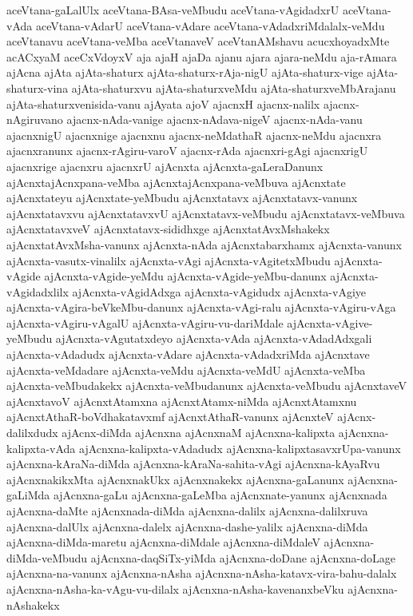 {aceVtana-gaLalUlx
aceVtana-BAsa-veMbudu
aceVtana-vAgidadxrU
aceVtana-vAda
aceVtana-vAdarU
aceVtana-vAdare
aceVtana-vAdadxriMdalalx-veMdu
aceVtanavu
aceVtana-veMba
aceVtanaveV
aceVtanAMshavu
acucxhoyadxMte
acACxyaM
aceCxVdoyxV
aja
ajaH
ajaDa
ajanu
ajara
ajara-neMdu
aja-rAmara
ajAcna
ajAta
ajAta-shaturx
ajAta-shaturx-rAja-nigU
ajAta-shaturx-vige
ajAta-shaturx-vina
ajAta-shaturxvu
ajAta-shaturxveMdu
ajAta-shaturxveMbArajanu
ajAta-shaturxvenisida-vanu
ajAyata
ajoV
ajacnxH
ajacnx-nalilx
ajacnx-nAgiruvano
ajacnx-nAda-vanige
ajacnx-nAdava-nigeV
ajacnx-nAda-vanu
ajacnxnigU
ajacnxnige
ajacnxnu
ajacnx-neMdathaR
ajacnx-neMdu
ajacnxra
ajacnxranunx
ajacnx-rAgiru-varoV
ajacnx-rAda
ajacnxri-gAgi
ajacnxrigU
ajacnxrige
ajacnxru
ajacnxrU
ajAcnxta
ajAcnxta-gaLeraDanunx
ajAcnxtajAcnxpana-veMba
ajAcnxtajAcnxpana-veMbuva
ajAcnxtate
ajAcnxtateyu
ajAcnxtate-yeMbudu
ajAcnxtatavx
ajAcnxtatavx-vanunx
ajAcnxtatavxvu
ajAcnxtatavxvU
ajAcnxtatavx-veMbudu
ajAcnxtatavx-veMbuva
ajAcnxtatavxveV
ajAcnxtatavx-sididhxge
ajAcnxtatAvxMshakekx
ajAcnxtatAvxMsha-vanunx
ajAcnxta-nAda
ajAcnxtabarxhamx
ajAcnxta-vanunx
ajAcnxta-vasutx-vinalilx
ajAcnxta-vAgi
ajAcnxta-vAgitetxMbudu
ajAcnxta-vAgide
ajAcnxta-vAgide-yeMdu
ajAcnxta-vAgide-yeMbu-danunx
ajAcnxta-vAgidadxlilx
ajAcnxta-vAgidAdxga
ajAcnxta-vAgidudx
ajAcnxta-vAgiye
ajAcnxta-vAgira-beVkeMbu-danunx
ajAcnxta-vAgi-ralu
ajAcnxta-vAgiru-vAga
ajAcnxta-vAgiru-vAgalU
ajAcnxta-vAgiru-vu-dariMdale
ajAcnxta-vAgive-yeMbudu
ajAcnxta-vAgutatxdeyo
ajAcnxta-vAda
ajAcnxta-vAdadAdxgali
ajAcnxta-vAdadudx
ajAcnxta-vAdare
ajAcnxta-vAdadxriMda
ajAcnxtave
ajAcnxta-veMdadare
ajAcnxta-veMdu
ajAcnxta-veMdU
ajAcnxta-veMba
ajAcnxta-veMbudakekx
ajAcnxta-veMbudanunx
ajAcnxta-veMbudu
ajAcnxtaveV
ajAcnxtavoV
ajAcnxtAtamxna
ajAcnxtAtamx-niMda
ajAcnxtAtamxnu
ajAcnxtAthaR-boVdhakatavxmf
ajAcnxtAthaR-vanunx
ajAcnxteV
ajAcnx-dalilxdudx
ajAcnx-diMda
ajAcnxna
ajAcnxnaM
ajAcnxna-kalipxta
ajAcnxna-kalipxta-vAda
ajAcnxna-kalipxta-vAdadudx
ajAcnxna-kalipxtasavxrUpa-vanunx
ajAcnxna-kAraNa-diMda
ajAcnxna-kAraNa-sahita-vAgi
ajAcnxna-kAyaRvu
ajAcnxnakikxMta
ajAcnxnakUkx
ajAcnxnakekx
ajAcnxna-gaLanunx
ajAcnxna-gaLiMda
ajAcnxna-gaLu
ajAcnxna-gaLeMba
ajAcnxnate-yanunx
ajAcnxnada
ajAcnxna-daMte
ajAcnxnada-diMda
ajAcnxna-dalilx
ajAcnxna-dalilxruva
ajAcnxna-dalUlx
ajAcnxna-dalelx
ajAcnxna-dashe-yalilx
ajAcnxna-diMda
ajAcnxna-diMda-maretu
ajAcnxna-diMdale
ajAcnxna-diMdaleV
ajAcnxna-diMda-veMbudu
ajAcnxna-daqSiTx-yiMda
ajAcnxna-doDane
ajAcnxna-doLage
ajAcnxna-na-vanunx
ajAcnxna-nAsha
ajAcnxna-nAsha-katavx-vira-bahu-dalalx
ajAcnxna-nAsha-ka-vAgu-vu-dilalx
ajAcnxna-nAsha-kavenanxbeVku
ajAcnxna-nAshakekx
}
